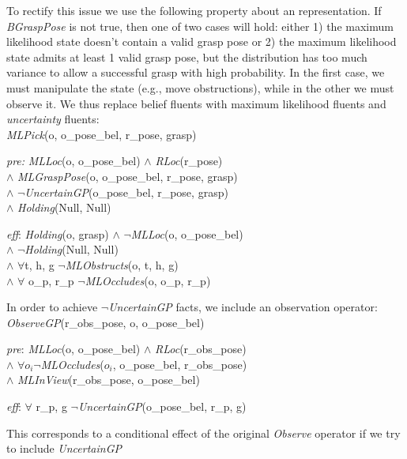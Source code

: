 To rectify this issue we use the following property about an \mld{}
representation. If \emph{BGraspPose} is not true, then one of two
cases will hold: either 1) the maximum likelihood state doesn't contain a valid grasp pose or 2) the maximum likelihood state admits at least 1 valid grasp pose, but the distribution has too much variance to allow
a successful grasp with high probability. In the first case, we must
manipulate the state (e.g., move obstructions), while in the other we must observe it. We
thus replace belief fluents with maximum likelihood fluents and
\emph{uncertainty} fluents:\\
\emph{MLPick}(o, o\_pose\_bel, r\_pose, grasp)
\vspace{-1mm}
\begin{tightlist}
\item[\emph{pre:}] \emph{MLLoc}(o, o\_pose\_bel) $\wedge$
  \emph{RLoc}(r\_pose) \\$\wedge$ \emph{MLGraspPose}(o,
  o\_pose\_bel, r\_pose, grasp) \\$\wedge$
  $\lnot$\emph{UncertainGP}(o\_pose\_bel, r\_pose, grasp)\\$\wedge$
  \emph{Holding}(Null, Null)
\item[\emph{eff}:] \emph{Holding}(o, grasp) $\wedge$
  $\lnot$\emph{MLLoc}(o, o\_pose\_bel) \\$\wedge$
  $\lnot$\emph{Holding}(Null, Null) \\$\wedge$ $\forall$t, h, g
  $\lnot$\emph{MLObstructs}(o, t, h, g)\\ $\wedge$ $\forall$ o\_p,
  r\_p $\lnot$\emph{MLOccludes}(o, o\_p, r\_p)
\end{tightlist}
In order to achieve $\lnot$\emph{UncertainGP} facts, we include an
observation operator:\\
\emph{ObserveGP}(r\_obs\_pose, o, o\_pose\_bel)
\begin{tightlist}
  \item[\emph{pre}:] \emph{MLLoc}(o, o\_pose\_bel) $\wedge$
    \emph{RLoc}(r\_obs\_pose) \\$\wedge$ $\forall o_i
    \lnot$\emph{MLOccludes}($o_i$, o\_pose\_bel, r\_obs\_pose) \\ $\wedge$
    \emph{MLInView}(r\_obs\_pose, o\_pose\_bel)
  \item[\emph{eff}:] $\forall$ r\_p, g $\lnot$\emph{UncertainGP}(o\_pose\_bel, r\_p, g)
\end{tightlist}
This corresponds to a conditional effect of the original
\emph{Observe} operator if we try to include \emph{UncertainGP}
